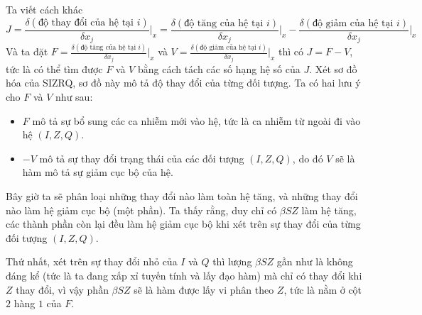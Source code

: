 \documentclass[12pt]{scrartcl}
\begin{document}
Ta viết cách khác \[
J = \frac{\delta(\text{độ thay đổi của hệ tại }i)}{\delta x_j}\Bigg|_{x} = 
\frac{\delta(\text{độ tăng của hệ tại }i)}{\delta x_j}\Bigg|_{x} - \frac{\delta(\text{độ giảm của hệ tại }i)}{\delta x_j}\Bigg|_{x}
\]
Và ta đặt $F = 
\frac{\delta(\text{độ tăng của hệ tại }i)}{\delta x_j}\Bigg|_{x}$ và $V =\frac{\delta(\text{độ giảm của hệ tại }i)}{\delta x_j}\Bigg|_{x}$ thì có $J = F - V$, tức là có thể tìm được $F$ và $V$ bằng cách tách các số hạng hệ số của $J$. Xét sơ đồ hóa của SIZRQ, sơ đồ này mô tả độ thay đổi của từng đối tượng. 
Ta có hai lưu ý cho $F$ và $V$ như sau:
\begin{itemize}[label=-]
    \item $F$ mô tả sự bổ sung các ca nhiễm mới vào hệ, tức là ca nhiễm từ ngoài đi vào hệ $(I,Z,Q)$. 
    \item $-V$ mô tả sự thay đổi trạng thái của các đối tượng $(I,Z,Q)$, do đó  $V$ sẽ là hàm mô tả sự giảm cục bộ của hệ.
\end{itemize}
Bây giờ ta sẽ phân loại những thay đổi nào làm toàn hệ tăng, và những thay đổi nào làm hệ giảm cục bộ (một phần). Ta thấy rằng, duy chỉ có $\beta S Z$ làm hệ tăng, các thành phần còn lại đều làm hệ giảm cục bộ khi xét trên sự thay đổi của từng đối tượng $(I,Z,Q)$.

Thứ nhất, xét trên sự thay đổi nhỏ của $I$ và $Q$ thì lượng $\beta S Z$ gần như là không đáng kể (tức là ta đang xấp xỉ tuyến tính và lấy đạo hàm) mà chỉ có thay đổi khi $Z$ thay đổi, vì vậy phần $\beta S Z$ sẽ là hàm được lấy vi phân theo $Z$, tức là nằm ở cột $2$ hàng $1$ của $F$.
\end{document}
